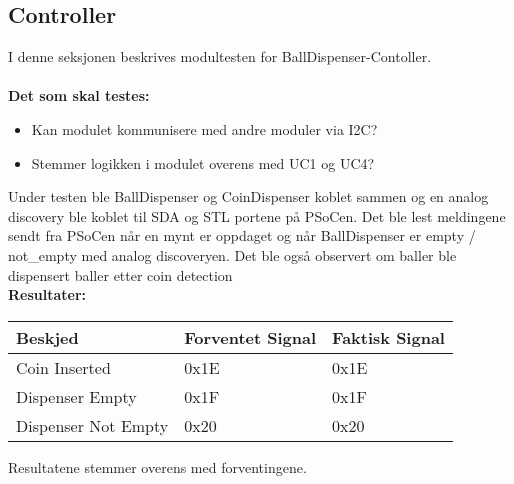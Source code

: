 \documentclass[Modultest/Modultest_main.tex]{subfiles}
\begin{document}
\subsection{Controller} \label{sec:DispController}
I denne seksjonen beskrives modultesten for BallDispenser-Contoller.\\
 \\ \textbf{Det som skal testes: }
\begin{itemize}
    \item Kan modulet kommunisere med andre moduler via I2C?
    \item Stemmer logikken i modulet overens med UC1 og UC4?
\end{itemize}
Under testen ble BallDispenser og CoinDispenser koblet sammen og en analog discovery ble koblet til SDA og STL portene på PSoCen. Det ble lest meldingene sendt fra PSoCen når en mynt er oppdaget og når BallDispenser er empty / not\_empty med analog discoveryen. Det ble også observert om baller ble dispensert baller etter coin detection\\

\textbf{Resultater: }
\begin{table}[H]
\centering
\begin{tabular}{|l|l|l|}
\hline
\rowcolor[HTML]{9B9B9B} 
Beskjed             & Forventet Signal & Faktisk Signal \\ \hline
Coin Inserted       & 0x1E             & 0x1E           \\ \hline
Dispenser Empty     & 0x1F             & 0x1F           \\ \hline
Dispenser Not Empty & 0x20             & 0x20           \\ \hline
\end{tabular}
\end{table}

Resultatene stemmer overens med forventingene.
\end{document}
